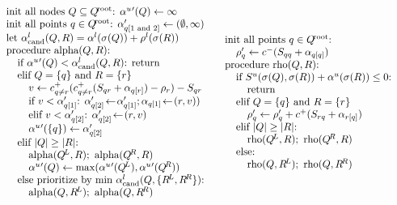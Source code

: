 \documentclass{article}
\newcommand{\kdroot}[1]{#1^{\!\text{root}}}
\newcommand{\kdleft}[1]{#1^{\!L}}
\newcommand{\kdright}[1]{#1^{\!R}}
\newcommand{\x}{\\ \hspace{0.15in}}
\newcommand{\xx}{\\ \hspace{0.3in}}
\newcommand{\cpos}[2]{c^{+}_{#1 \neq #2}}
\newcommand{\simil}[2]{S_{#1#2}}
\newcommand{\frho}[1]{\rho_{#1}}
\newcommand{\falphaj}[2]{\alpha_{#1[#2]}}
\newcommand{\falphamax}{\alpha^{u}}
\newcommand{\falphamin}{\alpha^{l}}
\newcommand{\frhomin}{\rho^{l}}
\newcommand{\alphacand}{v}
\begin{document}
\begin{figure}
  \begin{equation*}
    \begin{array}{ll}
      \begin{array}{l}
        \text{init all nodes }Q \subseteq \kdroot{Q}\text{: }\falphamax{'}(Q) \gets \infty
        \\ \text{init all points }q \in \kdroot{Q}\text{: }\falphaj{q}{1\text{ and }2}' \gets (\emptyset, \infty)
        \\ \text{let }\falphamin_{\text{cand}}(Q, R) = \falphamin(\sigma(Q)) + \frhomin(\sigma(R))
        \\ \text{procedure alpha}(Q,R)\text{:}
        \x \text{if }\falphamax{'}(Q) < \falphamin_{\text{cand}}(Q, R)\text{: return}
        \x \text{elif }Q = \{q\} \text{ and } R = \{r\}
        \xx \alphacand \gets \cpos{q}{r}(\cpos{q}{r}(\simil{q}{r} + \falphaj{q}{r}) - \frho{r}) - \simil{q}{r}
        \xx \text{if }\alphacand < \falphaj{q}{1}'\text{: } \falphaj{q}{2}' \!\gets\! \falphaj{q}{1}'; \falphaj{q}{1} \!\gets\! (r, \alphacand))
        \xx \text{elif }\alphacand < \falphaj{q}{2}'\text{: } \falphaj{q}{2}' \!\gets\! (r, \alphacand)
        \xx \falphamax{'}(\{q\}) \gets \falphaj{q}{2}'
        \x \text{elif }|Q| \geq |R|\text{:}
        \xx \text{alpha}(\kdleft{Q}, R); \text{ alpha}(\kdright{Q}, R)
        \xx \falphamax{'}(Q) \gets \max(\falphamax{'}(\kdleft{Q}), \falphamax{'}(\kdright{Q}))
        \x \text{else prioritize by min }\falphamin_{\text{cand}}(Q,\{\kdleft{R}, \kdright{R}\}){:}
        \xx \text{alpha}(Q, \kdleft{R}); \text{ alpha}(Q, \kdright{R})
      \end{array}
      &
      \begin{array}{l}
        \text{init all points }q \in \kdroot{Q}\text{: }
        \x \frho{q}'\gets c^{-}(\simil{q}{q} + \falphaj{q}{q})
        \\ \text{procedure rho}(Q,R)\text{:}
        \x \text{if }S^u(\sigma(Q),\sigma(R)) + \falphamax(\sigma(R)) \leq 0\text{:}
        \xx \text{return}
        \x \text{elif }Q = \{q\} \text{ and } R = \{r\}
        \xx \frho{q}' \gets \frho{q}' + c^{+}(\simil{r}{q} + \falphaj{r}{q})
        \x \text{elif }|Q| \geq |R|\text{:}
        \xx \text{rho}(\kdleft{Q}, R); \text{ rho}(\kdright{Q}, R)
        \x \text{else:}
        \xx \text{rho}(Q, \kdleft{R}); \text{ rho}(Q, \kdright{R})
      \end{array}
    \end{array}
  \end{equation*}
  \label{fig:alpharho}
\end{figure}
\end{document}
